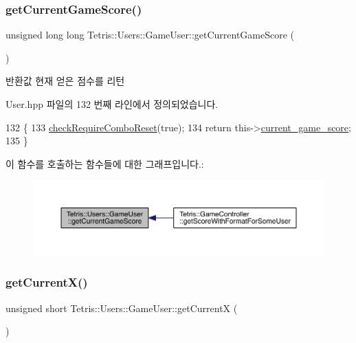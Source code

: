 \subsubsection{\texorpdfstring{get\+Current\+Game\+Score()}{getCurrentGameScore()}}
{\footnotesize\ttfamily unsigned long long Tetris\+::\+Users\+::\+Game\+User\+::get\+Current\+Game\+Score (\begin{DoxyParamCaption}{ }\end{DoxyParamCaption})\hspace{0.3cm}{\ttfamily [inline]}}

\begin{DoxyReturn}{반환값}
현재 얻은 점수를 리턴 
\end{DoxyReturn}


User.\+hpp 파일의 132 번째 라인에서 정의되었습니다.


\begin{DoxyCode}
132                                                     \{
133                 \hyperlink{class_tetris_1_1_users_1_1_game_user_a82ea0dfdb99643a1b577a22f5e504346}{checkRequireComboReset}(\textcolor{keyword}{true});
134                 \textcolor{keywordflow}{return} this->\hyperlink{class_tetris_1_1_users_1_1_game_user_aae9d0156964b3872f7cd3917ae662ec2}{current\_game\_score};
135             \}
\end{DoxyCode}
이 함수를 호출하는 함수들에 대한 그래프입니다.\+:
\nopagebreak
\begin{figure}[H]
\begin{center}
\leavevmode
\includegraphics[width=350pt]{d8/d9a/class_tetris_1_1_users_1_1_game_user_a93bde8123ee0dc9333d62a44b904023c_icgraph}
\end{center}
\end{figure}
\mbox{\label{class_tetris_1_1_users_1_1_game_user_ad25eace96bd27ae6df4a0c0d506be730}} 
\subsubsection{\texorpdfstring{get\+Current\+X()}{getCurrentX()}\hspace{0.1cm}{\footnotesize\ttfamily [1/2]}}
{\footnotesize\ttfamily unsigned short Tetris\+::\+Users\+::\+Game\+User\+::get\+CurrentX (\begin{DoxyParamCaption}{ }\end{DoxyParamCaption})}



